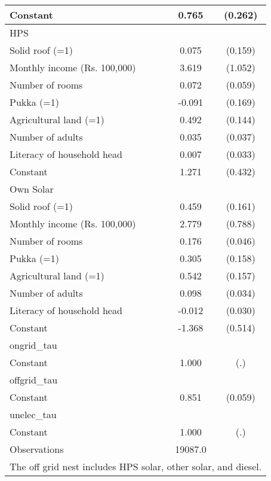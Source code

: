 \begin{table}[htbp]
{\begin{tabular}{l*{1}{cc}}
Constant            &       0.765\sym{***}&     (0.262)\\
\midrule
HPS                   &                     &            \\
Solid roof (=1)          &       0.075         &     (0.159)\\
Monthly income (Rs. 100,000)         &       3.619\sym{***}&     (1.052)\\
Number of rooms           &       0.072         &     (0.059)\\
Pukka (=1)                &      -0.091         &     (0.169)\\
Agricultural land (=1)             &       0.492\sym{***}&     (0.144)\\
Number of adults          &       0.035         &     (0.037)\\
Literacy of household head         &       0.007         &     (0.033)\\
Constant            &       1.271\sym{***}&     (0.432)\\
\midrule
Own Solar                   &                     &            \\
Solid roof (=1)          &       0.459\sym{***}&     (0.161)\\
Monthly income (Rs. 100,000)         &       2.779\sym{***}&     (0.788)\\
Number of rooms           &       0.176\sym{***}&     (0.046)\\
Pukka (=1)                &       0.305\sym{*}  &     (0.158)\\
Agricultural land (=1)             &       0.542\sym{***}&     (0.157)\\
Number of adults          &       0.098\sym{***}&     (0.034)\\
Literacy of household head         &      -0.012         &     (0.030)\\
Constant            &      -1.368\sym{***}&     (0.514)\\
\midrule
ongrid\_tau          &                     &            \\
Constant            &       1.000         &         (.)\\
\midrule
offgrid\_tau         &                     &            \\
Constant            &       0.851\sym{***}&     (0.059)\\
\midrule
unelec\_tau          &                     &            \\
Constant            &       1.000         &         (.)\\
\midrule
Observations        &     19087.0         &            \\
\bottomrule
\multicolumn{3}{l}{\footnotesize The off grid nest includes HPS solar, other solar, and diesel.}\\
\end{tabular}}
\end{table}
